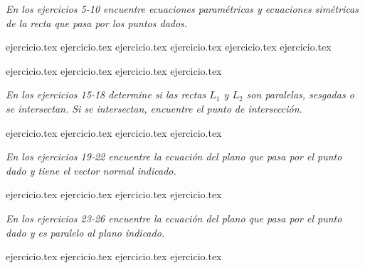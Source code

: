 \vspace{0.3cm}
\noindent\textit{En los ejercicios 5-10 encuentre ecuaciones paramétricas y ecuaciones simétricas de la recta que pasa por los puntos dados.}

\begin{enumerate}
    \setcounter{enumi}{4}
    {ejercicio.tex}
{ejercicio.tex}
{ejercicio.tex}
{ejercicio.tex}
{ejercicio.tex}
{ejercicio.tex}
\end{enumerate}

\vspace{0.3cm}
\begin{enumerate}
    \setcounter{enumi}{10}
    {ejercicio.tex}
{ejercicio.tex}
{ejercicio.tex}
{ejercicio.tex}
\end{enumerate}

\vspace{0.3cm}
\noindent\textit{En los ejercicios 15-18 determine si las rectas $L_1$ y $L_2$ son paralelas, sesgadas o se intersectan. Si se intersectan, encuentre el punto de intersección.}

\begin{enumerate}
    \setcounter{enumi}{14}
    {ejercicio.tex}
{ejercicio.tex}
{ejercicio.tex}
{ejercicio.tex}
\end{enumerate}

\vspace{0.3cm}
\noindent\textit{En los ejercicios 19-22 encuentre la ecuación del plano que pasa por el punto dado y tiene el vector normal indicado.}

\begin{enumerate}
    \setcounter{enumi}{18}
    {ejercicio.tex}
{ejercicio.tex}
{ejercicio.tex}
{ejercicio.tex}
\end{enumerate}

\vspace{0.3cm}
\noindent\textit{En los ejercicios 23-26 encuentre la ecuación del plano que pasa por el punto dado y es paralelo al plano indicado.}

\begin{enumerate}
    \setcounter{enumi}{22}
    {ejercicio.tex}
{ejercicio.tex}
{ejercicio.tex}
{ejercicio.tex}
\end{enumerate}

